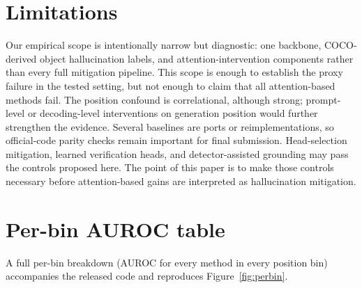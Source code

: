 \documentclass[letterpaper]{article} \usepackage[submission]{aaai2027}  \usepackage[hyphens]{url}  \usepackage{graphicx} \urlstyle{rm} \def\UrlFont{\rm}  \usepackage{natbib}  \usepackage{caption} \frenchspacing
\begin{document}
 \section*{Limitations}

Our empirical scope is intentionally narrow but diagnostic: one backbone, COCO-derived object hallucination labels, and attention-intervention components rather than every full mitigation pipeline. This scope is enough to establish the proxy failure in the tested setting, but not enough to claim that all attention-based methods fail. The position confound is correlational, although strong; prompt-level or decoding-level interventions on generation position would further strengthen the evidence. Several baselines are ports or reimplementations, so official-code parity checks remain important for final submission. Head-selection mitigation, learned verification heads, and detector-assisted grounding may pass the controls proposed here. The point of this paper is to make those controls necessary before attention-based gains are interpreted as hallucination mitigation.
 
\appendix
\section{Per-bin AUROC table}
\label{sec:appendix}
A full per-bin breakdown (AUROC for every method in every position bin) accompanies the released code and reproduces Figure~\ref{fig:perbin}.
 

\end{document}
